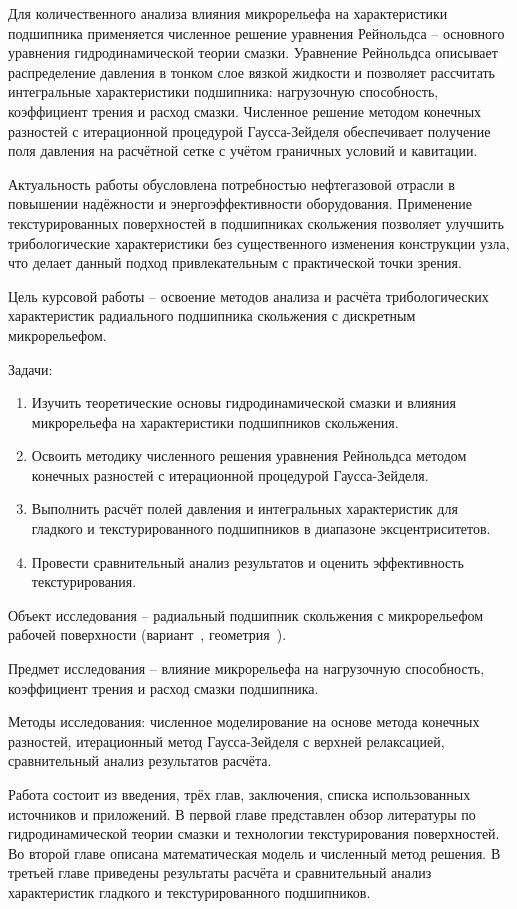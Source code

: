 Для количественного анализа влияния микрорельефа на характеристики подшипника применяется численное решение уравнения Рейнольдса -- основного уравнения гидродинамической теории смазки. Уравнение Рейнольдса описывает распределение давления в тонком слое вязкой жидкости и позволяет рассчитать интегральные характеристики подшипника: нагрузочную способность, коэффициент трения и расход смазки. Численное решение методом конечных разностей с итерационной процедурой Гаусса-Зейделя обеспечивает получение поля давления на расчётной сетке с учётом граничных условий и кавитации.

Актуальность работы обусловлена потребностью нефтегазовой отрасли в повышении надёжности и энергоэффективности оборудования. Применение текстурированных поверхностей в подшипниках скольжения позволяет улучшить трибологические характеристики без существенного изменения конструкции узла, что делает данный подход привлекательным с практической точки зрения.

Цель курсовой работы -- освоение методов анализа и расчёта трибологических характеристик радиального подшипника скольжения с дискретным микрорельефом.

Задачи:
\begin{enumerate}
    \item Изучить теоретические основы гидродинамической смазки и влияния микрорельефа на характеристики подшипников скольжения.
    \item Освоить методику численного решения уравнения Рейнольдса методом конечных разностей с итерационной процедурой Гаусса-Зейделя.
    \item Выполнить расчёт полей давления и интегральных характеристик для гладкого и текстурированного подшипников в диапазоне эксцентриситетов.
    \item Провести сравнительный анализ результатов и оценить эффективность текстурирования.
\end{enumerate}

Объект исследования -- радиальный подшипник скольжения с \varDimpleTypeGenitive{} микрорельефом рабочей поверхности (вариант~\varNumber, геометрия~\varGeomLetter).

Предмет исследования -- влияние \varDimpleTypeGenitive{} микрорельефа на нагрузочную способность, коэффициент трения и расход смазки подшипника.

Методы исследования: численное моделирование на основе метода конечных разностей, итерационный метод Гаусса-Зейделя с верхней релаксацией, сравнительный анализ результатов расчёта.

Работа состоит из введения, трёх глав, заключения, списка использованных источников и приложений. В первой главе представлен обзор литературы по гидродинамической теории смазки и технологии текстурирования поверхностей. Во второй главе описана математическая модель и численный метод решения. В третьей главе приведены результаты расчёта и сравнительный анализ характеристик гладкого и текстурированного подшипников.
